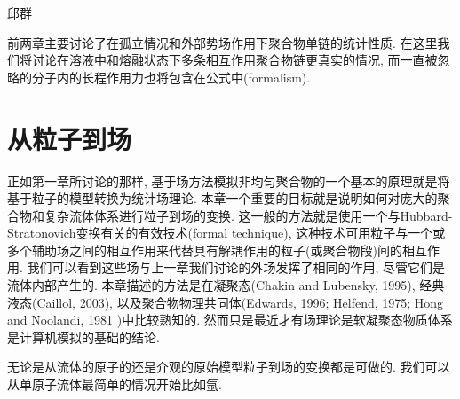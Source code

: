  {\color{red}\begin{center}
      邱群  
    \end{center}}
   
前两章主要讨论了在孤立情况和外部势场作用下聚合物单链的统计性质.
    在这里我们将讨论在溶液中和熔融状态下多条相互作用聚合物链更真实的情况,
    而一直被忽略的分子内的长程作用力也将包含在公式中(formalism).
    \section{从粒子到场}
    正如第一章所讨论的那样,
    基于场方法模拟非均匀聚合物的一个基本的原理就是将基于粒子的模型转换为统计场理论.
    本章一个重要的目标就是说明如何对庞大的聚合物和复杂流体体系进行粒子到场的变换.
    这一般的方法就是使用一个与Hubbard-Stratonovich变换有关的有效技术(formal
    technique),
    这种技术可用粒子与一个或多个辅助场之间的相互作用来代替具有解耦作用的粒子(或聚合物段)间的相互作用.
    我们可以看到这些场与上一章我们讨论的外场发挥了相同的作用,
    尽管它们是流体内部产生的. 本章描述的方法是在凝聚态(Chakin and Lubensky,
    1995), 经典液态(Caillol, 2003), 以及聚合物物理共同体(Edwards, 1996;
    Helfend, 1975; Hong and Noolandi, 1981 )中比较熟知的.
    然而只是最近才有场理论是软凝聚态物质体系是计算机模拟的基础的结论.
    \par
    无论是从流体的原子的还是介观的原始模型粒子到场的变换都是可做的.
    我们可以从单原子流体最简单的情况开始比如氩. 
